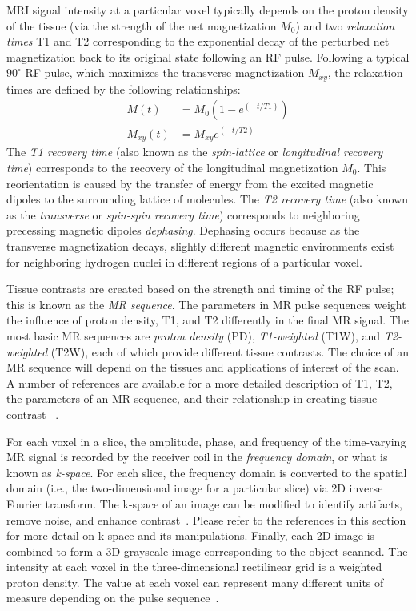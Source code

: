 MRI signal intensity at a particular voxel typically depends on the proton density of the tissue (via the strength of the net magnetization $M_0$) and two \textit{relaxation times} T1 and T2 corresponding to the exponential decay of the perturbed net magnetization back to its original state following an RF pulse. Following a typical $90^{\circ}$ RF pulse, which maximizes the transverse magnetization $M_{xy}$, the relaxation times are defined by the following relationships:
\begin{align}
M(t) &= M_0(1 - e^{(-t/T1)}) \\
M_{xy}(t) &= M_{xy}e^{(-t/T2)}
\end{align}
The \textit{T1 recovery time} (also known as the \textit{spin-lattice} or \textit{longitudinal recovery time}) corresponds to the recovery of the longitudinal magnetization $M_0$. This reorientation is caused by the transfer of energy from the excited magnetic dipoles to the surrounding lattice of molecules. The \textit{T2 recovery time}  (also known as the \textit{transverse} or \textit{spin-spin recovery time}) corresponds to neighboring precessing magnetic dipoles \textit{dephasing}. Dephasing occurs because as the transverse magnetization decays, slightly different magnetic environments exist for neighboring hydrogen nuclei in different regions of a particular voxel.

Tissue contrasts are created based on the strength and timing of the RF pulse; this is known as the \textit{MR sequence}. The parameters in MR pulse sequences weight the influence of proton density, T1, and T2 differently in the final MR signal. The most basic MR sequences are \textit{proton density} (PD), \textit{T1-weighted} (T1W), and \textit{T2-weighted} (T2W), each of which provide different tissue contrasts. The choice of an MR sequence will depend on the tissues and applications of interest of the scan. A number of references are available for a more detailed description of T1, T2, the parameters of an MR sequence, and their relationship in creating tissue contrast~\cite{nishimura_2010, brown_semelka_2003, webb_2003} .

For each voxel in a slice, the amplitude, phase, and frequency of the time-varying MR signal is recorded by the receiver coil in the \textit{frequency domain}, or what is known as \textit{k-space}. For each slice, the frequency domain is converted to the spatial domain (i.e., the two-dimensional image for a particular slice) via 2D inverse Fourier transform. The k-space of an image can be modified to identify artifacts, remove noise, and enhance contrast~\cite{imaios}. Please refer to the references in this section for more detail on k-space and its manipulations. Finally, each 2D image is combined to form a 3D grayscale image corresponding to the object scanned. The intensity at each voxel in the three-dimensional rectilinear grid is a weighted proton density. The value at each voxel can represent many different units of measure depending on the pulse sequence~\cite{beek_hoffman_2008}.

